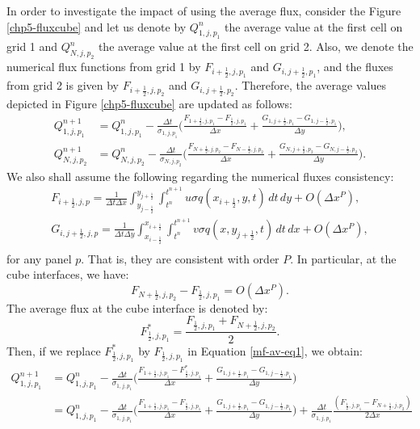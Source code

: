 In order to investigate the impact of using the average flux, consider the Figure \ref{chp5-fluxcube} and let us
denote by $Q^n_{1,j,p_1}$ the average value at the first cell on grid 1 and
$Q^n_{N,j,p_2}$ the average value at the first cell on grid 2.
Also, we denote the numerical flux functions from grid 1 by $F_{i+\frac{1}{2},j,p_1}$ and $G_{i,j+\frac{1}{2},p_1}$, 
and the fluxes from grid 2 is given by $F_{i+\frac{1}{2},j,p_2}$ and $G_{i,j+\frac{1}{2},p_2}$.
Therefore, the average values depicted in Figure  \ref{chp5-fluxcube} are updated as follows:
\begin{align}
	Q_{1,j,p_1}^{n+1} &= Q_{1,j,p_1}^n - \frac{\Delta t}{\sigma_{1,j,p_1}} \bigg(
	\frac{F_{1+\frac{1}{2},j,p_1}-F_{\frac{1}{2},j,p_1}}{\Delta x}+
	 \frac{G_{1,j+\frac{1}{2},p_1}-G_{1,j-\frac{1}{2},p_1}}{\Delta y} \bigg), \label{mf-av-eq1}\\
	Q_{N,j,p_2}^{n+1} &= Q_{N,j,p_2}^n - \frac{\Delta t}{\sigma_{N,j,p_2}} \bigg(
	\frac{F_{N+\frac{1}{2},j,p_2}-F_{N-\frac{1}{2},j,p_2}}{\Delta x}+
	\frac{G_{N,j+\frac{1}{2},p_2}-G_{N,j-\frac{1}{2},p_2}}{\Delta y} \bigg).
\end{align}
We also shall assume the following regarding the numerical fluxes consistency:
\begin{align*}
	F_{i+\frac{1}{2},j,p} = \frac{1}{\Delta t \Delta x}
	\int_{y_{j-\frac{1}{2}}}^{y_{j+\frac{1}{2}}} \int_{t^n}^{t^{n+1}} u\sigma q (x_{i+\frac{1}{2}},y,t)\,dt \,dy + O(\Delta x^P),\\
	G_{i,j+\frac{1}{2},j,p} = \frac{1}{\Delta t \Delta y}
	\int_{x_{i-\frac{1}{2}}}^{x_{i+\frac{1}{2}}} \int_{t^n}^{t^{n+1}} v\sigma q (x,y_{j+\frac{1}{2}},t)\,dt \,dx + O(\Delta x^P),\\
\end{align*}
for any panel $p$.
That is, they are consistent with order $P$.
In particular, at the cube interfaces, we have:
\begin{equation}
\label{mf-av-order}
F_{N+\frac{1}{2},j,p_2}-F_{\frac{1}{2},j,p_1} = O(\Delta x^P).
\end{equation}
The average flux at the cube interface is denoted by:
\begin{equation}
 F^{*}_{\frac{1}{2},j,p_1} = \frac{F_{\frac{1}{2},j,p_1}+F_{N+\frac{1}{2},j,p_2}}{2}.
\end{equation}
Then, if we replace $F^{*}_{\frac{1}{2},j,p_1}$ by $F_{\frac{1}{2},j,p_1}$ in Equation \eqref{mf-av-eq1}, we obtain:
\begin{align*}
	Q_{1,j,p_1}^{n+1} &= Q_{1,j,p_1}^n - \frac{\Delta t}{\sigma_{1,j,p_1}} \bigg(
    \frac{F_{1+\frac{1}{2},j,p_1}-F_{\frac{1}{2},j,p_1}^*}{\Delta x}+
    \frac{G_{1,j+\frac{1}{2},p_1}-G_{1,j-\frac{1}{2},p_1}}{\Delta y} \bigg)\\
	&= 
	Q_{1,j,p_1}^n - \frac{\Delta t}{\sigma_{1,j,p_1}} \bigg(
	\frac{F_{1+\frac{1}{2},j,p_1}-F_{\frac{1}{2},j,p_1}}{\Delta x}+
	\frac{G_{1,j+\frac{1}{2},p_1}-G_{1,j-\frac{1}{2},p_1}}{\Delta y} \bigg)
	+\frac{\Delta t}{\sigma_{1,j,p_1}} 
\frac{(F_{\frac{1}{2},j,p_1}-F_{N+\frac{1}{2},j,p_2})}{2\Delta x}
\end{align*}

